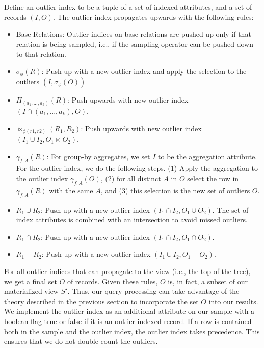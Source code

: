 \begin{definition}
Define an outlier index to be a tuple of a set of indexed attributes, and a set of records $(I,O)$. The outlier index propagates upwards with the following rules: 
\begin{itemize}[noitemsep]
\item Base Relations: Outlier indices on base relations are pushed up only if that relation is being sampled, i.e., if the sampling operator can be pushed down to that relation.
\item $\sigma_{\phi}(R)$: Push up with a new outlier index and apply the selection to the outliers $(I,\sigma_{\phi}(O))$ 
\item $\Pi_{(a_1,...,a_k)}(R)$: Push upwards with new outlier index $(I \cap (a_1,...,a_k), O)$.
\item $\bowtie_{\phi (r1,r2)}(R_1,R_2)$: Push upwards with new outlier index $(I_{1} \cup I_{2}, O_1 \bowtie O_2)$. 
\item $\gamma_{f,A}(R)$: For group-by aggregates, we set $I$ to be the aggregation attribute. For the outlier index, we do the following steps. (1) Apply the aggregation to the outlier index $\gamma_{f,A}(O)$, (2) for all distinct $A$ in $O$ select the row in $\gamma_{f,A}(R)$ with the same $A$, and (3) this selection is the new set of outliers $O$. 
\item $R_1 \cup R_2$: Push up with a new outlier index $(I_1 \cap I_2, O_1 \cup O_2)$. The set of index attributes is combined with an intersection to avoid missed outliers.
\item $R_1 \cap R_2$: Push up with a new outlier index $(I_1 \cap I_2, O_1 \cap O_2)$.
\item $R_1 - R_2$: Push up with a new outlier index $(I_1 \cup I_2, O_1 - O_2)$.
\end{itemize}
\end{definition}

For all outlier indices that can propagate to the view (i.e., the top of the tree), we get a final set $O$ of records. 
Given these rules, $O$ is, in fact, a subset of our materialized view $S'$.
Thus, our query processing can take advantage of the theory described in the previous section to incorporate the set $O$ into our results.
We implement the outlier index as an additional attribute on our sample with a boolean flag true or false if it is an outlier indexed record.
If a row is contained both in the sample and the outlier index, the outlier index takes precedence.
This ensures that we do not double count the outliers.

